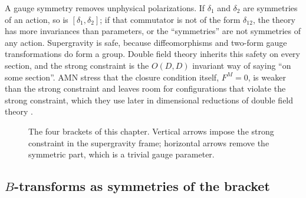 \begin{physicsbox}
A gauge symmetry removes unphysical polarizations. If $\delta_1$ and $\delta_2$ are symmetries of
an action, so is $[\delta_1,\delta_2]$; if that commutator is not of the form $\delta_{12}$, the
theory has more invariances than parameters, or the ``symmetries'' are not symmetries of any
action. Supergravity is safe, because diffeomorphisms and two-form gauge transformations do form
a group. Double field theory inherits this safety on every section, and the strong constraint is
the $O(D,D)$ invariant way of saying ``on some section''. AMN stress that the closure condition
itself, $F^M=0$, is weaker than the strong constraint and leaves room for configurations that violate the
strong constraint, which they use later in dimensional reductions of double field theory
 \TL.
\end{physicsbox}

\begin{figure}[ht]
\centering
{}
\caption{The four brackets of this chapter. Vertical arrows impose the strong constraint in the
supergravity frame; horizontal arrows remove the symmetric part, which is a trivial gauge
parameter.}\label{fig:courant:brackets}
\end{figure}

\subsection{\texorpdfstring{$B$}{B}-transforms as symmetries of the bracket}

